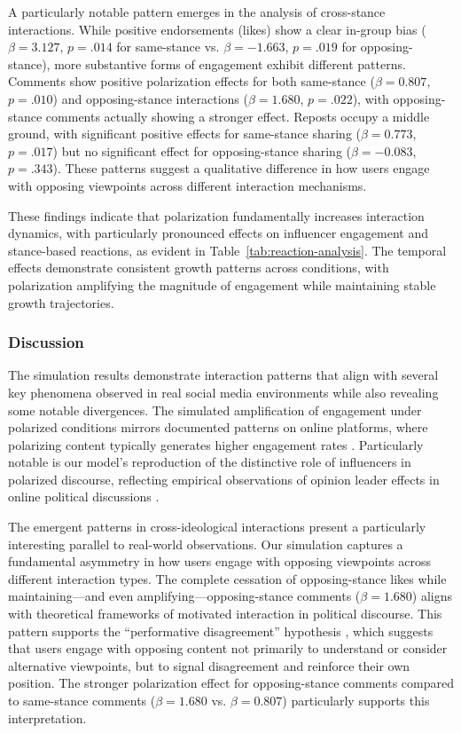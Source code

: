 A particularly notable pattern emerges in the analysis of cross-stance interactions. While positive endorsements (likes) show a clear in-group bias ($\beta = 3.127$, $p = .014$ for same-stance vs. $\beta = -1.663$, $p = .019$ for opposing-stance), more substantive forms of engagement exhibit different patterns. Comments show positive polarization effects for both same-stance ($\beta = 0.807$, $p = .010$) and opposing-stance interactions ($\beta = 1.680$, $p = .022$), with opposing-stance comments actually showing a stronger effect. Reposts occupy a middle ground, with significant positive effects for same-stance sharing ($\beta = 0.773$, $p = .017$) but no significant effect for opposing-stance sharing ($\beta = -0.083$, $p = .343$). These patterns suggest a qualitative difference in how users engage with opposing viewpoints across different interaction mechanisms.

These findings indicate that polarization fundamentally increases interaction dynamics, with particularly pronounced effects on influencer engagement and stance-based reactions, as evident in Table~\ref{tab:reaction-analysis}. The temporal effects demonstrate consistent growth patterns across conditions, with polarization amplifying the magnitude of engagement while maintaining stable growth trajectories.

\subsubsection{Discussion}

The simulation results demonstrate interaction patterns that align with several key phenomena observed in real social media environments while also revealing some notable divergences. The simulated amplification of engagement under polarized conditions mirrors documented patterns on online platforms, where polarizing content typically generates higher engagement rates \citep{simchon_troll_2022, horwitz_facebook_2020}. Particularly notable is our model's reproduction of the distinctive role of influencers in polarized discourse, reflecting empirical observations of opinion leader effects in online political discussions \citep{soares_influencers_2018, dubois_multiple_2014}.



The emergent patterns in cross-ideological interactions present a particularly interesting parallel to real-world observations. Our simulation captures a fundamental asymmetry in how users engage with opposing viewpoints across different interaction types. The complete cessation of opposing-stance likes while maintaining---and even amplifying---opposing-stance comments ($\beta = 1.680$) aligns with theoretical frameworks of motivated interaction in political discourse. This pattern supports the ``performative disagreement'' hypothesis \citep{bond_political_2022}, which suggests that users engage with opposing content not primarily to understand or consider alternative viewpoints, but to signal disagreement and reinforce their own position. The stronger polarization effect for opposing-stance comments compared to same-stance comments ($\beta = 1.680$ vs. $\beta = 0.807$) particularly supports this interpretation.

